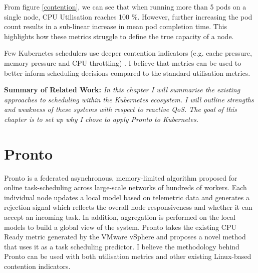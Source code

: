 From figure \ref{contention}, we can see that when running more than 5 pods on a
single node, CPU Utilisation reaches 100 \%. However, further increasing the pod
count results in a sub-linear increase in mean pod completion time. This
highlights how these metrics struggle to define the true capacity of a node.

Few Kubernetes schedulers use deeper contention indicators (e.g. cache pressure,
memory pressure and CPU throttling) \cite{intel-tas, Koordinator}. I believe
that metrics can be used to better inform scheduling decisions compared to the
standard utilisation metrics.

\begin{tcolorbox}[boxsep=0mm,left=2.5mm,right=2.5mm] \textbf{Summary of Related
Work:} {\em In this chapter I will summarise the existing approaches to
scheduling within the Kubernetes ecosystem. I will outline strengths and
weakness of these systems with respect to reactive QoS. The goal of this chapter
is to set up why I chose to apply Pronto to Kubernetes.} \end{tcolorbox}

\section{Pronto}
Pronto is a federated asynchronous, memory-limited algorithm proposed for
online task-scheduling across large-scale networks of hundreds of workers. Each
individual node updates a local model based on telemetric data and generates a
rejection signal which reflects the overall node responsiveness and whether it
can accept an incoming task. In addition, aggregation is performed on the local
models to build a global view of the system. Pronto takes the existing CPU Ready
metric generated by the VMware vSphere and proposes a novel method that uses it
as a task scheduling predictor. I believe the methodology behind Pronto can be
used with both utilisation metrics and other existing Linux-based contention
indicators.


